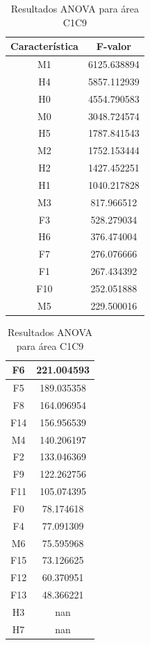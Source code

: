 \begin{table}[H]
	\begin{tabular}{|c|c|}
		\hline
		Característica & F-valor \\ \hline
		M1 & 6125.638894 \\ \hline
		H4 & 5857.112939 \\ \hline
		H0 & 4554.790583 \\ \hline
		M0 & 3048.724574 \\ \hline
		H5 & 1787.841543 \\ \hline
		M2 & 1752.153444 \\ \hline
		H2 & 1427.452251 \\ \hline
		H1 & 1040.217828 \\ \hline
		M3 & 817.966512 \\ \hline
		F3 & 528.279034 \\ \hline
		H6 & 376.474004 \\ \hline
		F7 & 276.076666 \\ \hline
		F1 & 267.434392 \\ \hline
		F10 & 252.051888 \\ \hline
		M5 & 229.500016 \\ \hline
	\end{tabular}	
	\begin{tabular}{|c|c|}
		\hline
		F6 & 221.004593 \\ \hline
		F5 & 189.035358 \\ \hline
		F8 & 164.096954 \\ \hline
		F14 & 156.956539 \\ \hline
		M4 & 140.206197 \\ \hline
		F2 & 133.046369 \\ \hline
		F9 & 122.262756 \\ \hline
		F11 & 105.074395 \\ \hline
		F0 & 78.174618 \\ \hline
		F4 & 77.091309 \\ \hline
		M6 & 75.595968 \\ \hline
		F15 & 73.126625 \\ \hline
		F12 & 60.370951 \\ \hline
		F13 & 48.366221 \\ \hline
		H3 & nan \\ \hline
		H7 & nan \\ \hline
	\end{tabular}	
	\caption{Resultados ANOVA para área C1C9}
	\label{tab:anova_c1c9}
\end{table}

